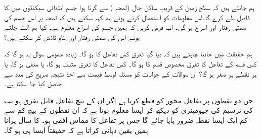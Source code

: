 ہم جانتے ہیں کہ سطح زمین کے قریب  ساکن حال (لمحہ ) سے گرتا ہوا  جسم ابتدائی  سیکنڈوں میں   کا فاصل طے کرے گا۔اس معلومات کو استعمال کرتے ہوئے ہم کہہ سکتے ہیں کہ لمحہ  پر  اس جسم کی سمتی رفتار  اور اسراع
  ہو گی۔ اب فرض کریں کہ ہمیں جسم کی اسراع معلوم ہے۔ کیا ہم الٹ چلتے ہوئے اس کی سمتی رفتار اور ہٹاو تلاش کر سکتے ہیں؟

ہم حقیقت میں جاننا چاہتے ہیں کہ دیا گیا تفرق کس تفاعل کا ہو گا۔ زیادہ عمومی سوال یہ ہو گا کہ کس قسم کے تفاعل کا تفرق مخصوص قسم کا ہو گا۔ کس تفاعل کا تفرق مثبت ہو گا، یا منفی ہو گا، یا ہر نقطے پر صفر ہو گا؟ ان سوالات کے جوابات کو مسئلہ اوسط قیمت سے اخذ نتیجہ صریح  کی مدد سے حاصل کیا جا سکتا ہے۔

جن دو نقطوں پر تفاعل  محور  کو قطع  کرتا ہے اگر ان کے بیچ تفاعل قابل تفرق ہو تب  کی  ترسیم کی جیومیٹری کو دیکھ کر ایسا معلوم ہوتا ہے کہ ان نقطوں کے بیچ کم سے کم ایک ایسا نقطہ ضرور پایا جائے گا جس پر تفاعل کا مماس افقی ہو۔   کا  سال پرانا  ہمیں یقین دہانی کراتا ہے کہ حقیقتاً ایسا ہی ہو گا۔

